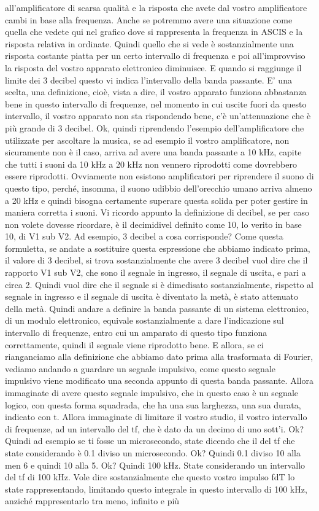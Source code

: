all'amplificatore di scarsa qualità e la risposta che avete dal vostro amplificatore cambi in base alla frequenza. Anche se potremmo avere una situazione come quella che vedete qui nel grafico dove si rappresenta la frequenza in ASCIS e la risposta relativa in ordinate. Quindi quello che si vede è sostanzialmente una risposta costante piatta per un certo intervallo di frequenza e poi all'improvviso la risposta del vostro apparato elettronico diminuisce. E quando si raggiunge il limite dei 3 decibel questo vi indica l'intervallo della banda passante. E' una scelta, una definizione, cioè, vista a dire, il vostro apparato funziona abbastanza bene in questo intervallo di frequenze, nel momento in cui uscite fuori da questo intervallo, il vostro apparato non sta rispondendo bene, c'è un'attenuazione che è più grande di 3 decibel. Ok, quindi riprendendo l'esempio dell'amplificatore che utilizzate per ascoltare la musica, se ad esempio il vostro amplificatore, non sicuramente non è il caso, arriva ad avere una banda passante a 10 kHz, capite che tutti i suoni da 10 kHz a 20 kHz non vennero riprodotti come dovrebbero essere riprodotti. Ovviamente non esistono amplificatori per riprendere il suono di questo tipo, perché, insomma, il suono udibbio dell'orecchio umano arriva almeno a 20 kHz e quindi bisogna certamente superare questa solida per poter gestire in maniera corretta i suoni. Vi ricordo appunto la definizione di decibel, se per caso non volete dovesse ricordare, è il decimidivel definito come 10, lo verito in base 10, di V1 sub V2. Ad esempio, 3 decibel a cosa corrisponde? Come questa formuletta, se andate a sostituire questa espressione che abbiamo indicato prima, il valore di 3 decibel, si trova sostanzialmente che avere 3 decibel vuol dire che il rapporto V1 sub V2, che sono il segnale in ingresso, il segnale di uscita, e pari a circa 2. Quindi vuol dire che il segnale si è dimedisato sostanzialmente, rispetto al segnale in ingresso e il segnale di uscita è diventato la metà, è stato attenuato della metà. Quindi andare a definire la banda passante di un sistema elettronico, di un modulo elettronico, equivale sostanzialmente a dare l'indicazione sul intervallo di frequenze, entro cui un amparato di questo tipo funziona correttamente, quindi il segnale viene riprodotto bene. E allora, se ci rianganciamo alla definizione che abbiamo dato prima alla trasformata di Fourier, vediamo andando a guardare un segnale impulsivo, come questo segnale impulsivo viene modificato una seconda appunto di questa banda passante. Allora immaginate di avere questo segnale impulsivo, che in questo caso è un segnale logico, con questa forma squadrada, che ha una sua larghezza, una sua durata, indicato con t. Allora immaginate di limitare il vostro studio, il vostro intervallo di frequenze, ad un intervallo del tf, che è dato da un decimo di uno sott'i. Ok? Quindi ad esempio se ti fosse un microsecondo, state dicendo che il del tf che state considerando è 0.1 diviso un microsecondo. Ok? Quindi 0.1 diviso 10 alla men 6 e quindi 10 alla 5. Ok? Quindi 100 kHz. State considerando un intervallo del tf di 100 kHz. Vole dire sostanzialmente che questo vostro impulso fdT lo state rappresentando, limitando questo integrale in questo intervallo di 100 kHz, anziché rappresentarlo tra meno, infinito e più 